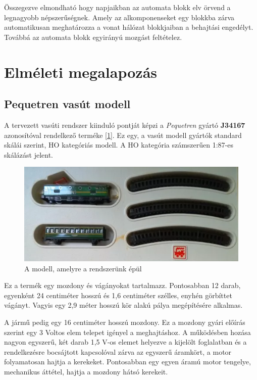 \documentclass[a4paper,12pt]{article}
\begin{document}
Összegezve elmondható hogy napjaikban az automata blokk elv örvend a legnagyobb népszerűségnek. 
Amely az alkomponenseket egy blokkba zárva automatikusan meghatározza a vonat hálózat blokkjaiban a behajtási engedélyt.
Továbbá az automata blokk egyirányú mozgást feltételez.


\newpage
\section{Elméleti megalapozás}\label{theory_section}

\subsection{Pequetren vasút modell} \label{sec:ptmodell}
A tervezett vasúti rendszer kiinduló pontját képzi a \textit{Pequetren} gyártó \textbf{J34167} azonosítóval rendelkező terméke [\ref{fig:peque_tren}].
Ez egy, a vasút modell gyártók standard skálái szerint, HO kategóriás modell.
A HO kategória számszerűen 1:87-es skálázást jelent.

\begin{figure}[htp]
	\centering
	\includegraphics[width=\linewidth]{images/peque_tren.png}
	\caption[Vasút modell]{A modell, amelyre a rendszerünk épül}
	\label{fig:peque_tren}
\end{figure}

Ez a termék egy mozdony és vágányokat tartalmazz.
Pontosabban 12 darab, egyenként 24 centiméter hosszú és 1,6 centiméter szélles, enyhén görbíttet vágányt. 
Vagyis egy 2,9 méter hosszú kör alakú pálya megépítésére alkalmas.


A jármű pedig egy 16 centiméter hosszú mozdony. 
Ez a mozdony gyári előírás szerint egy 3 Voltos elem telepet igényel a meghajtáshoz.
A működésben hozása nagyon egyszerű, két darab 1,5 V-os elemet helyezve a kijelölt foglalatban és a rendelkezésre bocsájtott kapcsolóval zárva az egyszerű áramkört, a motor folyamatosan hajtja a kerekeket.
Pontosabban egy egyen áramú motor tengelye, mechanikus áttétel, hajtja a mozdony hátsó kerekeit.
\end{document}
